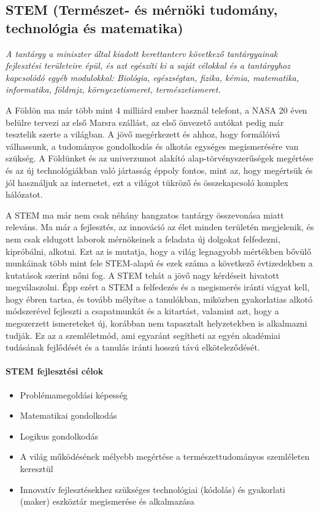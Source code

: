 \subsection[STEM]{STEM  (Természet- és mérnöki  tudomány, technológia és matematika)}
\emph{A tantárgy a miniszter által kiadott kerettanterv következő tantárgyainak fejlesztési területeire épül, és azt egészíti ki a saját célokkal és a tantárgyhoz kapcsolódó egyéb modulokkal:
Biológia, egészségtan, fizika, kémia, matematika, informatika, földrajz, környezetismeret, természetismeret.}


A Földön ma már több mint 4 milliárd ember használ telefont, a NASA 20 éven belülre tervezi az első Marsra szállást, az első önvezető autókat pedig már tesztelik szerte a világban. A jövő megérkezett és ahhoz, hogy formálóivá válhassunk, a tudományos gondolkodás és alkotás egységes megismerésére van szükség. A Földünket és az univerzumot alakító alap-törvényszerűségek megértése és az új technológiákban való jártasság éppoly fontos, mint az, hogy megértsük és jól használjuk az internetet, ezt a világot tükröző és összekapcsoló komplex hálózatot.

A STEM ma már nem csak néhány hangzatos tantárgy összevonása miatt releváns. Ma már a fejlesztés, az innováció az élet minden területén megjelenik, és nem csak eldugott laborok mérnökeinek a feladata új dolgokat felfedezni, kipróbálni, alkotni. Ezt az is mutatja, hogy a világ legnagyobb mértékben bővülő munkáinak több mint fele STEM-alapú és ezek száma a következő évtizedekben a kutatások szerint nőni fog. A STEM tehát a jövő nagy kérdéseit hivatott megválaszolni. Épp ezért a STEM a felfedezés és a megismerés iránti vágyat kell, hogy ébren tartsa, és tovább mélyítse a tanulókban, miközben gyakorlatias alkotó módszerével fejleszti a csapatmunkát és a kitartást, valamint azt, hogy a megszerzett ismereteket új, korábban nem tapasztalt helyzetekben is alkalmazni tudják. Ez az a szemléletmód, ami egyaránt segítheti az egyén akadémiai tudásának fejlődését és a tanulás iránti hosszú távú elköteleződését.

\paragraph{STEM fejlesztési célok}
\begin{itemize}
\item Problémamegoldási képesség
\item  Matematikai gondolkodás
\item  Logikus gondolkodás
\item  A világ működésének mélyebb megértése a természettudományos szemléleten keresztül
\item  Innovatív fejlesztésekhez szükséges technológiai (kódolás) és gyakorlati (maker) eszköztár megismerése és alkalmazása
\end{itemize}

